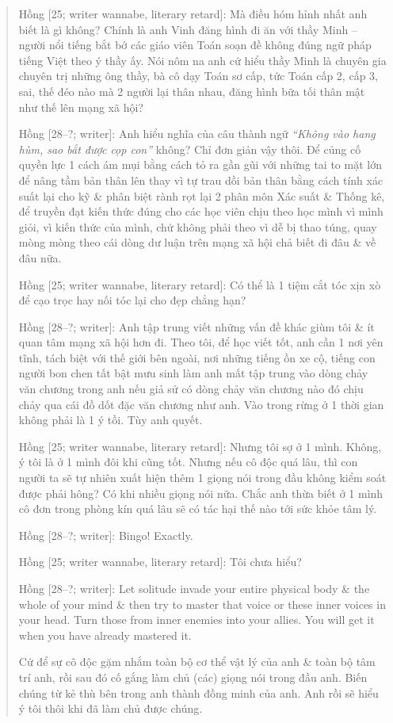 \documentclass[12pt]{article}
\begin{document}
\begin{quotation}
	{\sf Hồng [25; writer wannabe, literary retard]}: Mà điều hóm hỉnh nhất anh biết là gì không? Chính là anh Vinh đăng hình đi ăn với thầy Minh -- người nổi tiếng bắt bớ các giáo viên Toán soạn đề không đúng ngữ pháp tiếng Việt theo ý thầy ấy. Nói nôm na anh cứ hiểu thầy Minh là chuyên gia chuyên trị những ông thầy, bà cô dạy Toán sơ cấp, tức Toán cấp 2, cấp 3, sai, thế đéo nào mà 2 người lại thân nhau, đăng hình bữa tối thân mật như thế lên mạng xã hội?
	
	{\sf Hồng [28--?; writer]}: Anh hiểu nghĩa của câu thành ngữ {\it ``Không vào hang hùm, sao bắt được cọp con''} không? Chỉ đơn giản vậy thôi. Để củng cố quyền lực 1 cách ám mụi bằng cách tỏ ra gần gũi với những tai to mặt lớn để nâng tầm bản thân lên thay vì tự trau dồi bản thân bằng cách tính xác suất lại cho kỹ \& phân biệt rành rọt lại 2 phân môn Xác suất \& Thống kê, để truyền đạt kiến thức đúng cho các học viên chịu theo học mình vì mình giỏi, vì kiến thức của mình, chứ không phải theo vì dễ bị thao túng, quay mòng mòng theo cái dòng dư luận trên mạng xã hội chả biết đi đâu \& về đâu nữa.
	
	{\sf Hồng [25; writer wannabe, literary retard]}: Có thể là 1 tiệm cắt tóc xịn xò để cạo trọc hay nối tóc lại cho đẹp chẳng hạn?
	
	{\sf Hồng [28--?; writer]}: Anh tập trung viết những vấn đề khác giùm tôi \& ít quan tâm mạng xã hội hơn đi. Theo tôi, để học viết tốt, anh cần 1 nơi yên tĩnh, tách biệt với thế giới bên ngoài, nơi những tiếng ồn xe cộ, tiếng con người bon chen tất bật mưu sinh làm anh mất tập trung vào dòng chảy văn chương trong anh nếu giả sử có dòng chảy văn chương nào đó chịu chảy qua cái đồ dốt đặc văn chương như anh. Vào trong rừng ở 1 thời gian không phải là 1 ý tồi. Tùy anh quyết.
	
	{\sf Hồng [25; writer wannabe, literary retard]}: Nhưng tôi sợ ở 1 mình. Không, ý tôi là ở 1 mình đôi khi cũng tốt. Nhưng nếu cô độc quá lâu, thì con người ta sẽ tự nhiên xuất hiện thêm 1 giọng nói trong đầu không kiểm soát được phải hông? Có khi nhiều giọng nói nữa. Chắc anh thừa biết ở 1 mình cô đơn trong phòng kín quá lâu sẽ có tác hại thế nào tới sức khỏe tâm lý.
	
	{\sf Hồng [28--?; writer]}: Bingo! Exactly.
	
	{\sf Hồng [25; writer wannabe, literary retard]}: Tôi chưa hiểu?
	
	{\sf Hồng [28--?; writer]}: Let solitude invade your entire physical body \& the whole of your mind \& then try to master that voice or these inner voices in your head. Turn those from inner enemies into your allies. You will get it when you have already mastered it.
	
	Cứ để sự cô độc gặm nhắm toàn bộ cơ thể vật lý của anh \& toàn bộ tâm trí anh, rồi sau đó cố gắng làm chủ (các) giọng nói trong đầu anh. Biến chúng từ kẻ thù bên trong anh thành đồng minh của anh. Anh rồi sẽ hiểu ý tôi thôi khi đã làm chủ được chúng.
\end{quotation}
\end{document}
